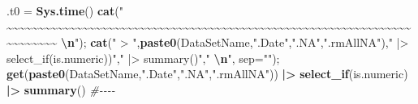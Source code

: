\documentclass[
]{article}
\newenvironment{Shaded}{\begin{snugshade}}{\end{snugshade}}
\newcommand{\AttributeTok}[1]{\textcolor[rgb]{0.13,0.29,0.53}{#1}}
\newcommand{\CommentTok}[1]{\textcolor[rgb]{0.56,0.35,0.01}{\textit{#1}}}
\newcommand{\FunctionTok}[1]{\textcolor[rgb]{0.13,0.29,0.53}{\textbf{#1}}}
\newcommand{\NormalTok}[1]{#1}
\newcommand{\OtherTok}[1]{\textcolor[rgb]{0.56,0.35,0.01}{#1}}
\newcommand{\SpecialCharTok}[1]{\textcolor[rgb]{0.81,0.36,0.00}{\textbf{#1}}}
\newcommand{\StringTok}[1]{\textcolor[rgb]{0.31,0.60,0.02}{#1}}
\begin{document}
\begin{Shaded}
\begin{Highlighting}[]
  
\NormalTok{.t0 }\OtherTok{=} \FunctionTok{Sys.time}\NormalTok{()}
\FunctionTok{cat}\NormalTok{(}\StringTok{"    \textasciitilde{}\textasciitilde{}\textasciitilde{}\textasciitilde{}\textasciitilde{}\textasciitilde{}\textasciitilde{}\textasciitilde{}\textasciitilde{}\textasciitilde{}\textasciitilde{}\textasciitilde{}\textasciitilde{}\textasciitilde{}\textasciitilde{}\textasciitilde{}\textasciitilde{}\textasciitilde{}\textasciitilde{}\textasciitilde{}\textasciitilde{}\textasciitilde{}\textasciitilde{}\textasciitilde{}\textasciitilde{}\textasciitilde{}\textasciitilde{}\textasciitilde{}\textasciitilde{}\textasciitilde{}\textasciitilde{}\textasciitilde{}\textasciitilde{}\textasciitilde{}\textasciitilde{}\textasciitilde{}\textasciitilde{}\textasciitilde{}\textasciitilde{}\textasciitilde{}\textasciitilde{}\textasciitilde{}\textasciitilde{}\textasciitilde{}\textasciitilde{}\textasciitilde{}\textasciitilde{}\textasciitilde{}\textasciitilde{}\textasciitilde{}\textasciitilde{}\textasciitilde{}\textasciitilde{}\textasciitilde{}\textasciitilde{}\textasciitilde{}\textasciitilde{}\textasciitilde{}\textasciitilde{}\textasciitilde{}\textasciitilde{}\textasciitilde{}\textasciitilde{}\textasciitilde{}\textasciitilde{}\textasciitilde{}\textasciitilde{}\textasciitilde{}\textasciitilde{}\textasciitilde{}\textasciitilde{}\textasciitilde{}    }\SpecialCharTok{\textbackslash{}n}\StringTok{"}\NormalTok{); }\FunctionTok{cat}\NormalTok{(}\StringTok{" \textgreater{} "}\NormalTok{,}\FunctionTok{paste0}\NormalTok{(DataSetName,}\StringTok{".Date"}\NormalTok{,}\StringTok{".NA"}\NormalTok{,}\StringTok{".rmAllNA"}\NormalTok{),}\StringTok{" |\textgreater{} select\_if(is.numeric))"}\NormalTok{,}\StringTok{" |\textgreater{} summary()"}\NormalTok{,}\StringTok{"  }\SpecialCharTok{\textbackslash{}n}\StringTok{"}\NormalTok{, }\AttributeTok{sep=}\StringTok{""}\NormalTok{); }\FunctionTok{get}\NormalTok{(}\FunctionTok{paste0}\NormalTok{(DataSetName,}\StringTok{".Date"}\NormalTok{,}\StringTok{".NA"}\NormalTok{,}\StringTok{".rmAllNA"}\NormalTok{)) }\SpecialCharTok{|\textgreater{}} \FunctionTok{select\_if}\NormalTok{(is.numeric) }\SpecialCharTok{|\textgreater{}} \FunctionTok{summary}\NormalTok{() }\CommentTok{\#{-}{-}{-}{-}  }

\end{Highlighting}
\end{Shaded}
\end{document}

